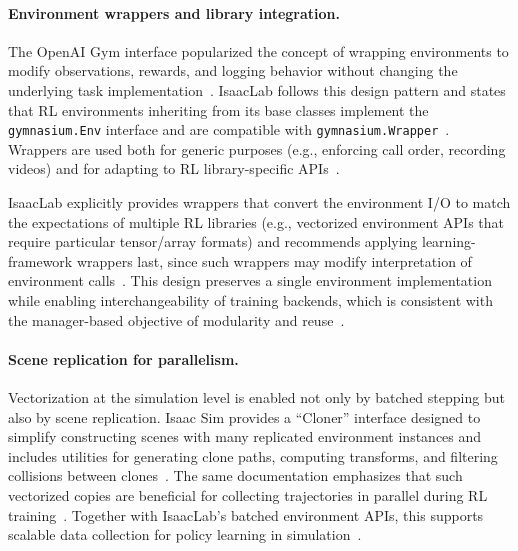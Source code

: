 \paragraph{Environment wrappers and library integration.}
The OpenAI Gym interface popularized the concept of wrapping environments to modify observations, rewards, and logging behavior without changing the underlying task implementation~\cite{Brockman2016OpenAIGym}. IsaacLab follows this design pattern and states that \ac{RL} environments inheriting from its base classes implement the \texttt{gymnasium.Env} interface and are compatible with \texttt{gymnasium.Wrapper}~\cite{isaaclab_wrap_env}. Wrappers are used both for generic purposes (e.g., enforcing call order, recording videos) and for adapting to \ac{RL} library-specific APIs~\cite{isaaclab_wrap_env,isaaclab_training_rl_agent}.

IsaacLab explicitly provides wrappers that convert the environment I/O to match the expectations of multiple \ac{RL} libraries (e.g., vectorized environment APIs that require particular tensor/array formats) and recommends applying learning-framework wrappers last, since such wrappers may modify interpretation of environment calls~\cite{isaaclab_training_rl_agent,isaaclab_rl_api}. This design preserves a single environment implementation while enabling interchangeability of training backends, which is consistent with the manager-based objective of modularity and reuse~\cite{isaaclab_task_design_workflows,isaaclab_rl_api}.

\paragraph{Scene replication for parallelism.}
Vectorization at the simulation level is enabled not only by batched stepping but also by scene replication. Isaac Sim provides a ``Cloner'' interface designed to simplify constructing scenes with many replicated environment instances and includes utilities for generating clone paths, computing transforms, and filtering collisions between clones~\cite{isaacsim_cloner_tutorial}. The same documentation emphasizes that such vectorized copies are beneficial for collecting trajectories in parallel during \ac{RL} training~\cite{isaacsim_cloner_tutorial}. Together with IsaacLab's batched environment APIs, this supports scalable data collection for policy learning in simulation~\cite{isaaclab_envs_api,NVIDIA2025IsaacLab}.

